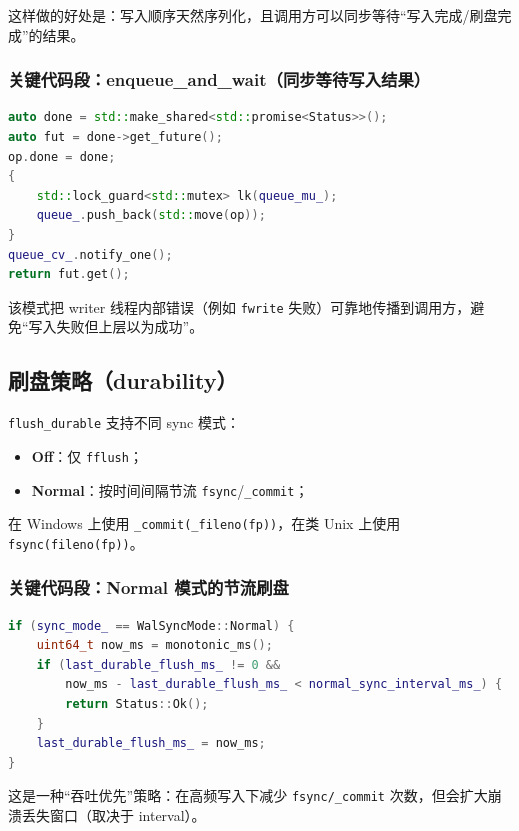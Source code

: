 这样做的好处是：写入顺序天然序列化，且调用方可以同步等待“写入完成/刷盘完成”的结果。

\subsubsection{关键代码段：enqueue\_and\_wait（同步等待写入结果）}

\begin{lstlisting}[language=C++,caption={入队并等待 writer 返回 Status（节选）}]
auto done = std::make_shared<std::promise<Status>>();
auto fut = done->get_future();
op.done = done;
{
    std::lock_guard<std::mutex> lk(queue_mu_);
    queue_.push_back(std::move(op));
}
queue_cv_.notify_one();
return fut.get();
\end{lstlisting}

该模式把 writer 线程内部错误（例如 \texttt{fwrite} 失败）可靠地传播到调用方，避免“写入失败但上层以为成功”。

\subsection{刷盘策略（durability）}

\texttt{flush\_durable} 支持不同 sync 模式：

\begin{itemize}
  \item \textbf{Off}：仅 \texttt{fflush}；
  \item \textbf{Normal}：按时间间隔节流 \texttt{fsync}/\texttt{\_commit}；
\end{itemize}

在 Windows 上使用 \texttt{\_commit(\_fileno(fp))}，在类 Unix 上使用 \texttt{fsync(fileno(fp))}。

\subsubsection{关键代码段：Normal 模式的节流刷盘}

\begin{lstlisting}[language=C++,caption={flush\_durable：Normal 模式的时间间隔判断（节选）}]
if (sync_mode_ == WalSyncMode::Normal) {
    uint64_t now_ms = monotonic_ms();
    if (last_durable_flush_ms_ != 0 &&
        now_ms - last_durable_flush_ms_ < normal_sync_interval_ms_) {
        return Status::Ok();
    }
    last_durable_flush_ms_ = now_ms;
}
\end{lstlisting}

这是一种“吞吐优先”策略：在高频写入下减少 \texttt{fsync/\_commit} 次数，但会扩大崩溃丢失窗口（取决于 interval）。

